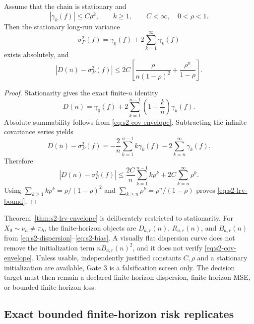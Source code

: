 \begin{theorem}
\label{thm:s2-lrv-envelope}
Assume that the chain is stationary and
\begin{equation}
 |\gamma_k(f)|\leq C\rho^k,
 \qquad k\geq1,
 \qquad C<\infty,\quad0<\rho<1.
 \label{eq:s2-cov-envelope}
\end{equation}
Then the stationary long-run variance
\[
 \sigma_P^2(f)
 =
 \gamma_0(f)+2\sum_{k=1}^{\infty}\gamma_k(f)
\]
exists absolutely, and
\begin{equation}
 |D(n)-\sigma_P^2(f)|
 \leq
 2C
 \left[
  \frac{\rho}{n(1-\rho)^2}
  +
  \frac{\rho^n}{1-\rho}
 \right].
 \label{eq:s2-lrv-bound}
\end{equation}
\end{theorem}

\begin{proof}
Stationarity gives the exact finite-\(n\) identity
\[
 D(n)
 =
 \gamma_0(f)
 +
 2\sum_{k=1}^{n-1}
 \left(1-\frac{k}{n}\right)\gamma_k(f).
\]
Absolute summability follows from \eqref{eq:s2-cov-envelope}.  Subtracting the
infinite covariance series yields
\[
 D(n)-\sigma_P^2(f)
 =
 -\frac2n\sum_{k=1}^{n-1}k\gamma_k(f)
 -
 2\sum_{k=n}^{\infty}\gamma_k(f).
\]
Therefore
\[
 |D(n)-\sigma_P^2(f)|
 \leq
 \frac{2C}{n}\sum_{k=1}^{n-1}k\rho^k
 +
 2C\sum_{k=n}^{\infty}\rho^k.
\]
Using
\(\sum_{k\geq1}k\rho^k=\rho/(1-\rho)^2\) and
\(\sum_{k\geq n}\rho^k=\rho^n/(1-\rho)\) proves
\eqref{eq:s2-lrv-bound}.
\end{proof}

\begin{remark}
\label{rem:s2-nonstationary-horizon}
Theorem~\ref{thm:s2-lrv-envelope} is deliberately restricted to
stationarity.  For \(X_0\sim\nu_a\neq\pi_h\), the finite-horizon objects are
\(D_{a,r}(n)\), \(R_{a,r}(n)\), and \(B_{a,r}(n)\) from
\eqref{eq:s2-dispersion}--\eqref{eq:s2-bias}.  A visually flat dispersion
curve does not remove the initialization term \(nB_{a,r}(n)^2\), and it does
not verify \eqref{eq:s2-cov-envelope}.  Unless usable, independently justified
constants \(C,\rho\) and a stationary initialization are available, Gate 3 is
a falsification screen only.  The decision target must then remain a declared
finite-horizon dispersion, finite-horizon MSE, or bounded finite-horizon loss.
\end{remark}

\subsection{Exact bounded finite-horizon risk replicates}
\label{subsec:stage2-risk-replicates}

